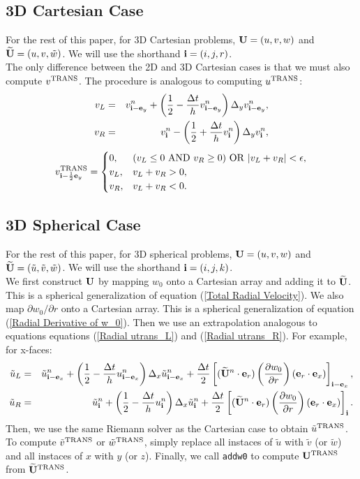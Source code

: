\documentclass[11pt]{article}
\def\half  {\frac{1}{2}}
\def\dt    {\Delta t}
\def\trans {\rm TRANS}
\def\eb    {{\bf e}}
\def\ib    {{\bf i}}
\def\Ub    {{\bf U}}
\def\Ubt   {\widetilde{\bf U}}
\def\ut    {\tilde{u}}
\def\vt    {\tilde{v}}
\def\wt    {\tilde{w}}
\begin{document}
\subsection{3D Cartesian Case}
For the rest of this paper, for 3D Cartesian problems, $\Ub = (u,v,w)$ and $\Ubt = (u,v,\wt)$.  We will use the shorthand $\ib = (i,j,r)$.\\

The only difference between the 2D and 3D Cartesian cases is that we must also compute $v^{\trans}$.  The procedure is analogous to computing $u^{\trans}$:
\begin{eqnarray}
v_L &=& v_{\ib-\eb_y}^n + \left(\half - \frac{\dt}{h}v_{\ib-\eb_y}^n\right)\Delta_y v_{\ib-\eb_y}^n, \\
v_R &=& v_{\ib}^n - \left(\half + \frac{\dt}{h}v_{\ib}^n\right)\Delta_y v_{\ib}^n,
\end{eqnarray}
\begin{equation}
v^{\trans}_{\ib-\half\eb_y} =
\begin{cases}
0, & (v_L \le 0 ~ {\rm AND} ~ v_R \ge 0) ~ {\rm OR} ~ |v_L + v_R| < \epsilon, \\
v_L, & v_L + v_R > 0, \\
v_R, & v_L + v_R < 0. \\
\end{cases}
\end{equation}
\subsection{3D Spherical Case}
For the rest of this paper, for 3D spherical problems, $\Ub = (u,v,w)$ and $\Ubt = (\ut,\vt,\wt)$.  We will use the shorthand $\ib = (i,j,k)$.\\

We first construct $\Ub$ by mapping $w_0$ onto a Cartesian array and adding it to $\Ubt$.  This is a spherical generalization of equation (\ref{Total Radial Velocity}).  We also map $\partial w_0/\partial r$ onto a Cartesian array.  This is a spherical generalization of equation (\ref{Radial Derivative of w_0}).  Then we use an extrapolation analogous to equations equations (\ref{Radial utrans_L}) and (\ref{Radial utrans_R}).  For example, for x-faces:
\begin{eqnarray}
\ut_L &=& \ut_{\ib-\eb_x}^n + \left(\half - \frac{\dt}{h}u_{\ib-\eb_x}^n\right)\Delta_x\ut_{\ib-\eb_x}^n + \frac{\dt}{2}\left[(\Ubt^n\cdot\eb_r)\left(\frac{\partial w_0}{\partial r}\right)(\eb_r\cdot\eb_x)\right]_{\ib-\eb_x}, \\
\ut_R &=& \ut_{\ib}^n + \left(\half - \frac{\dt}{h}u_{\ib}^n\right)\Delta_x\ut_{\ib}^n + \frac{\dt}{2}\left[(\Ubt^n\cdot\eb_r)\left(\frac{\partial w_0}{\partial r}\right)(\eb_r\cdot\eb_x)\right]_{\ib}.
\end{eqnarray}
Then, we use the same Riemann solver as the Cartesian case to obtain $\ut^{\trans}$.  To compute $\vt^{\trans}$ or $\wt^{\trans}$, simply replace all instaces of $\ut$ with $\vt$ (or $\wt$) and all instaces of $x$ with $y$ (or $z$).  Finally, we call {\tt addw0} to compute $\Ub^{\trans}$ from $\Ubt^{\trans}$.
\end{document}
